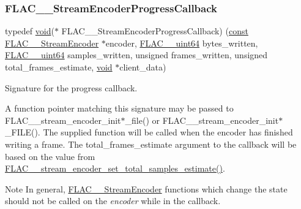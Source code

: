 \subsubsection{\texorpdfstring{F\+L\+A\+C\+\_\+\+\_\+\+Stream\+Encoder\+Progress\+Callback}{FLAC\_\_StreamEncoderProgressCallback}}
{\footnotesize\ttfamily typedef \hyperlink{png_8h_ac9c84fa68bbad002983e35ce3663c686}{void}($\ast$ F\+L\+A\+C\+\_\+\+\_\+\+Stream\+Encoder\+Progress\+Callback) (\hyperlink{zconf_8h_a2c212835823e3c54a8ab6d95c652660e}{const} \hyperlink{struct_f_l_a_c_____stream_encoder}{F\+L\+A\+C\+\_\+\+\_\+\+Stream\+Encoder} $\ast$encoder, \hyperlink{ordinals_8h_aa78c8c70a3eb8a58af7436f278acde8e}{F\+L\+A\+C\+\_\+\+\_\+uint64} bytes\+\_\+written, \hyperlink{ordinals_8h_aa78c8c70a3eb8a58af7436f278acde8e}{F\+L\+A\+C\+\_\+\+\_\+uint64} samples\+\_\+written, unsigned frames\+\_\+written, unsigned total\+\_\+frames\+\_\+estimate, \hyperlink{png_8h_ac9c84fa68bbad002983e35ce3663c686}{void} $\ast$client\+\_\+data)}

Signature for the progress callback.

A function pointer matching this signature may be passed to F\+L\+A\+C\+\_\+\+\_\+stream\+\_\+encoder\+\_\+init$\ast$\+\_\+file() or F\+L\+A\+C\+\_\+\+\_\+stream\+\_\+encoder\+\_\+init$\ast$\+\_\+\+F\+I\+LE(). The supplied function will be called when the encoder has finished writing a frame. The {\ttfamily total\+\_\+frames\+\_\+estimate} argument to the callback will be based on the value from \hyperlink{group__flac__stream__encoder_ga0d3f45052f2f7379c73e2b027c7f956c}{F\+L\+A\+C\+\_\+\+\_\+stream\+\_\+encoder\+\_\+set\+\_\+total\+\_\+samples\+\_\+estimate()}.

\begin{DoxyNote}{Note}
In general, \hyperlink{struct_f_l_a_c_____stream_encoder}{F\+L\+A\+C\+\_\+\+\_\+\+Stream\+Encoder} functions which change the state should not be called on the {\itshape encoder} while in the callback.
\end{DoxyNote}

